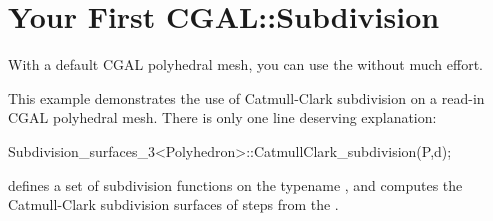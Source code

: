 




\section{Your First CGAL::Subdivision}
\label{secFirstSub}
With a default CGAL polyhedral mesh, you can 
use the  without much effort.


This example demonstrates the use of Catmull-Clark subdivision
on a read-in CGAL polyhedral mesh. There is only one line deserving
explanation:
\begin{ccExampleCode}
Subdivision_surfaces_3<Polyhedron>::CatmullClark_subdivision(P,d);
\end{ccExampleCode}
 defines a set of subdivision 
functions on the typename , and 
 computes the 
Catmull-Clark subdivision surfaces of  steps from the 
.


